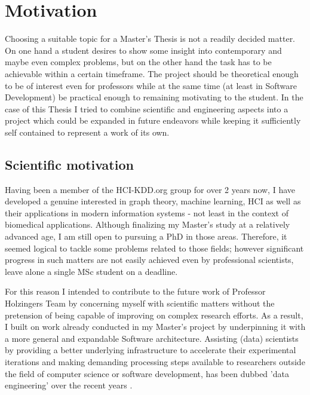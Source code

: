 \chapter{Motivation}
\label{ch:motivation}

Choosing a suitable topic for a Master's Thesis is not a readily decided matter. On one hand a student desires to show some insight into contemporary and maybe even complex problems, but on the other hand the task has to be achievable within a certain timeframe. The project should be theoretical enough to be of interest even for professors while at the same time (at least in Software Development) be practical enough to remaining motivating to the student. In the case of this Thesis I tried to combine scientific and engineering aspects into a project which could be expanded in future endeavors while keeping it sufficiently self contained to represent a work of its own.


\section{Scientific motivation}
\label{sect:scientific_motivation}

Having been a member of the HCI-KDD.org group for over 2 years now, I have developed a genuine interested in graph theory, machine learning, HCI as well as their applications in modern information systems - not least in the context of biomedical applications. Although finalizing my Master's study at a relatively advanced age, I am still open to pursuing a PhD in those areas. Therefore, it seemed logical to tackle some problems related to those fields; however significant progress in such matters are not easily achieved even by professional scientists, leave alone a single MSc student on a deadline.

For this reason I intended to contribute to the future work of Professor Holzingers Team by concerning myself with scientific matters without the pretension of being capable of improving on complex research efforts. As a result, I built on work already conducted in my Master's project by underpinning it with a more general and expandable Software architecture. Assisting (data) scientists by providing a better underlying infrastructure to accelerate their experimental iterations and making demanding processing steps available to researchers outside the field of computer science or software development, has been dubbed 'data engineering' over the recent years \citep{DataAnalysisDSWorkflow}. 

